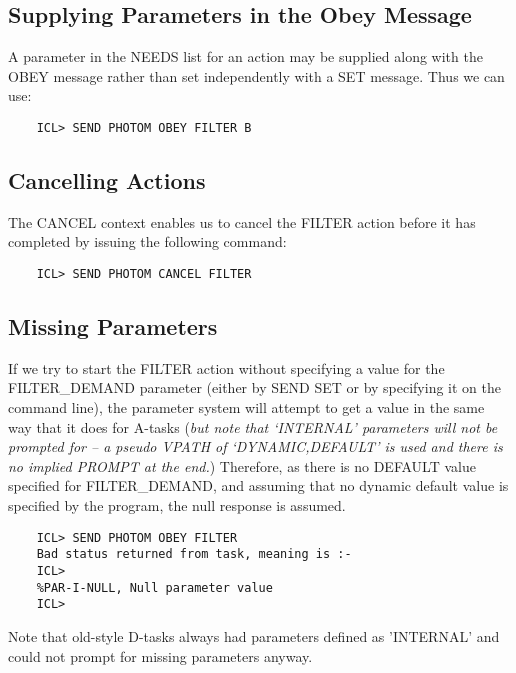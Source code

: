 \documentclass[twoside,11pt]{report}
\newcommand{\xlabel}[1]{}
\begin{document}
\subsection{\xlabel{supplying_parameters_in_the_obey_message}Supplying Parameters in the Obey Message}

A parameter in the NEEDS list for an action may be supplied along with the
OBEY message rather than set independently with a SET message. Thus we
can use:

\begin{verbatim}
    ICL> SEND PHOTOM OBEY FILTER B
\end{verbatim}
                           
\subsection{\xlabel{cancelling_actions}Cancelling Actions}

The CANCEL context enables us to cancel the FILTER action before it has
completed by issuing the following command:

\begin{verbatim}
    ICL> SEND PHOTOM CANCEL FILTER
\end{verbatim}
                               
\subsection{\xlabel{missing_parameters}Missing Parameters}

If we try to start the FILTER action without specifying a value for the 
FILTER\_DEMAND parameter (either by SEND SET or by specifying it on the 
command line), the parameter system will attempt to get a value in the
same way that it does for A-tasks ({\em but note that `INTERNAL' parameters
will not be prompted for -- a pseudo VPATH of `DYNAMIC,DEFAULT' is used and
there is no implied PROMPT at the end.})
Therefore, as there is no DEFAULT value specified for FILTER\_DEMAND, and
assuming that no dynamic default value is specified by the program, the
null response is assumed.

\begin{verbatim}
    ICL> SEND PHOTOM OBEY FILTER
    Bad status returned from task, meaning is :-
    ICL>
    %PAR-I-NULL, Null parameter value
    ICL>
\end{verbatim}

Note that old-style D-tasks always had parameters defined as 'INTERNAL'
and could not prompt for missing parameters anyway.
\end{document}
